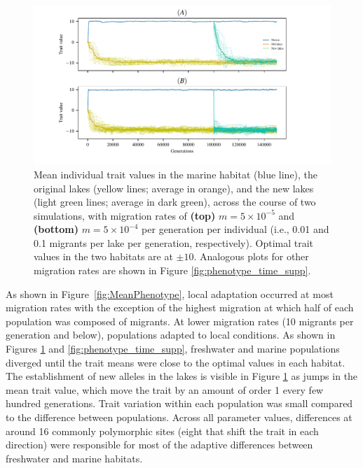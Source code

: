 \documentclass{article}
\begin{document}
\begin{figure}
	\begin{center}
        \includegraphics{Final_Plots/Pheno_Time.pdf}
  		\caption{ 
        		Mean individual trait values in the marine habitat (blue line),
        		the original lakes (yellow lines; average in orange),
        		and the new lakes (light green lines; average in dark green),
        		across the course of two simulations, with migration rates of
        		\textbf{(top)} $m=5 \times 10^{-5}$ and
        		\textbf{(bottom)} $m=5 \times 10^{-4}$ per generation per individual
        		(i.e., 0.01 and 0.1 migrants per lake per generation, respectively).
        		Optimal trait values in the two habitats are at $\pm 10$.
                	Analogous plots for other migration rates
                	are shown in Figure \ref{fig:phenotype_time_supp}.
		}
  		\label{fig:phenotype_time}
	\end{center}
\end{figure}

As shown in Figure~\ref{fig:MeanPhenotype}, local adaptation occurred at most migration rates with the exception of the highest migration at which half of each population was composed of migrants.
At lower migration rates (10 migrants per generation and below), populations adapted to local conditions.
As shown in Figures \ref{fig:phenotype_time} and \ref{fig:phenotype_time_supp},
freshwater and marine populations diverged until the trait means were close to the optimal values in each habitat. 
The establishment of new alleles in the lakes is visible in Figure \ref{fig:phenotype_time} as jumps in the mean trait value,
which move the trait by an amount of order 1 every few hundred generations.
Trait variation within each population was small compared to the difference between populations.
Across all parameter values, differences at around 16 commonly polymorphic sites 
(eight that shift the trait in each direction)
were responsible for most of the adaptive differences between freshwater and marine habitats.
\end{document}
